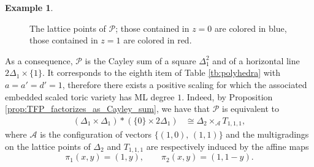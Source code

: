 \documentclass[12pt,reqno]{amsart}   	%
\theoremstyle{plain}
\theoremstyle{definition}
\newtheorem{example}[theorem]{Example}
\theoremstyle{remark}
\begin{document}
\begin{example}
\begin{figure}[H]
\begin{tikzpicture}


\end{tikzpicture}
    \caption{The lattice points of $\mathcal{P}$; those contained in $z=0$ are colored in blue, those contained in $z=1$ are colored in red.}
\end{figure}
As a consequence, $\mathcal{P}$ is the Cayley sum of a square $\Delta_1^2$ and of a horizontal line $2\Delta_1 \times \{1\}$. It corresponds to the eighth item of Table \ref{tb:polyhedra} with $a=a'=d'=1$, therefore there exists a positive scaling for which the associated embedded scaled toric variety has ML degree $1$. Indeed, by Proposition \ref{prop:TFP_factorizes_as_Cayley_sum}, we have that $\mathcal{P}$ is equivalent to
\begin{align*}
(\Delta_1 \times \Delta_1) \ast (\{0\}\times 2\Delta_1) %
&\cong \Delta_2 \times_{\mathcal{A}} T_{1,1,1},
\end{align*}
where $\mathcal{A}$ is the configuration of vectors $\{(1,0),\,(1,1)\}$ and the multigradings on the lattice points of $\Delta_2$ and $T_{1,1,1}$ are respectively induced by the affine maps
    \[\pi_1(x,y)=(1,y),\qquad \pi_2(x,y) = (1,1-y).\]

  \begin{figure}[H]
    \centering
\end{figure}
\end{example}
\end{document}

